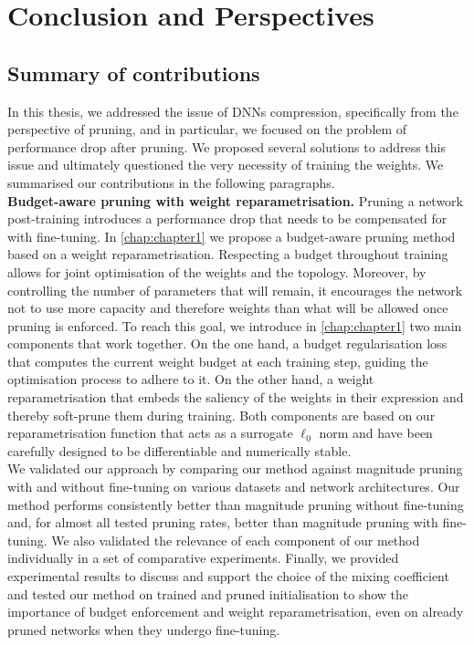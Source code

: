 \chapter{Conclusion and Perspectives}\label{chap:conclusion_chapter}

\localtableofcontents

\section{Summary of contributions}

In this thesis, we addressed the issue of \aclp{DNN} compression, specifically
from the perspective of pruning, and in particular, we focused on the problem of
performance drop after pruning. We proposed several solutions to address this
issue and ultimately questioned the very necessity of training the weights. We
summarised our contributions in the following paragraphs.\\

\noindent \textbf{Budget-aware pruning with weight reparametrisation.} Pruning a
network post-training introduces a performance drop that needs to be compensated
for with fine-tuning. In \cref{chap:chapter1} we propose a budget-aware pruning
method based on a weight reparametrisation. Respecting a budget throughout
training allows for joint optimisation of the weights and the topology.
Moreover, by controlling the number of parameters that will remain, it
encourages the network not to use more capacity and therefore weights than what
will be allowed once pruning is enforced.  To reach this goal, we introduce in
\cref{chap:chapter1} two main components that work together. On the one hand, a
budget regularisation loss that computes the current weight budget at each
training step, guiding the optimisation process to adhere to it. On the other
hand, a weight reparametrisation that embeds the saliency of the weights in
their expression and thereby soft-prune them during training. Both components
are based on our reparametrisation function that acts as a surrogate $\ell_0$
norm and have been carefully designed to be differentiable and numerically
stable.\\

We validated our approach by comparing our method against magnitude pruning with
and without fine-tuning on various datasets and network architectures. Our
method performs consistently better than magnitude pruning without fine-tuning
and, for almost all tested pruning rates, better than magnitude pruning with
fine-tuning. We also validated the relevance of each component of our method
individually in a set of comparative experiments. Finally, we provided
experimental results to discuss and support the choice of the mixing coefficient
and tested our method on trained and pruned initialisation to show the
importance of budget enforcement and weight reparametrisation, even on already
pruned networks when they undergo fine-tuning.\\

